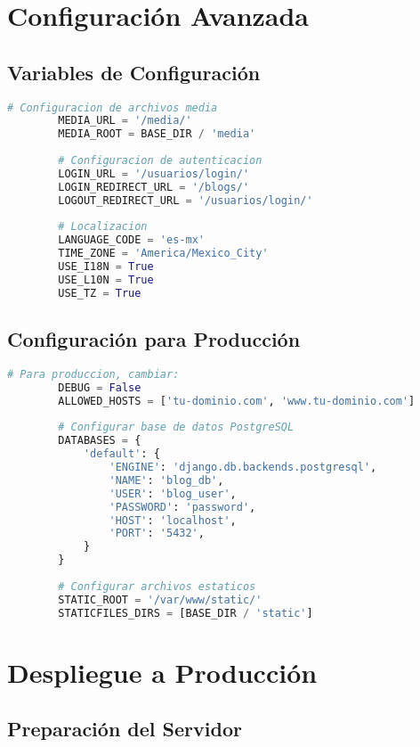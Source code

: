 \documentclass[11pt,a4paper]{report}
\begin{document}
	\section{Configuración Avanzada}
	
	\subsection{Variables de Configuración}
	
	\begin{lstlisting}[language=python]
		# Configuracion de archivos media
		MEDIA_URL = '/media/'
		MEDIA_ROOT = BASE_DIR / 'media'
		
		# Configuracion de autenticacion
		LOGIN_URL = '/usuarios/login/'
		LOGIN_REDIRECT_URL = '/blogs/'
		LOGOUT_REDIRECT_URL = '/usuarios/login/'
		
		# Localizacion
		LANGUAGE_CODE = 'es-mx'
		TIME_ZONE = 'America/Mexico_City'
		USE_I18N = True
		USE_L10N = True
		USE_TZ = True
	\end{lstlisting}
	
	\subsection{Configuración para Producción}
	
	\begin{lstlisting}[language=python]
		# Para produccion, cambiar:
		DEBUG = False
		ALLOWED_HOSTS = ['tu-dominio.com', 'www.tu-dominio.com']
		
		# Configurar base de datos PostgreSQL
		DATABASES = {
			'default': {
				'ENGINE': 'django.db.backends.postgresql',
				'NAME': 'blog_db',
				'USER': 'blog_user',
				'PASSWORD': 'password',
				'HOST': 'localhost',
				'PORT': '5432',
			}
		}
		
		# Configurar archivos estaticos
		STATIC_ROOT = '/var/www/static/'
		STATICFILES_DIRS = [BASE_DIR / 'static']
	\end{lstlisting}
	
	\section{Despliegue a Producción}
	
	\subsection{Preparación del Servidor}
	
\end{document}
